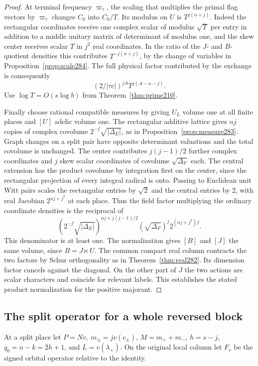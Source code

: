 \documentclass[a4paper,11pt]{article}
\theoremstyle{definition}
\theoremstyle{remark}
\numberwithin{equation}{section}
\begin{document}
\begin{proof}
At terminal frequency \(\varpi_\tau\), the scaling that
multiplies the primal flag vectors by \(\varpi_\tau\)
changes \(C_0\) into \(C_0/T\). Its modulus on \(U\)
is \(T^{j(n+j)}\). Indeed the rectangular coordinates
receive one complex scalar of modulus \(\sqrt T\) per
entry in addition to a middle unitary matrix of determinant
of modulus one, and the skew center receives scalar
\(T\) in \(j^2\) real coordinates. In the ratio of the
\(J\)- and \(B\)-quotient densities this contributes
\(T^{-j(n+j)}\), by the change of variables in
Proposition~\ref{prop:scale284}. The full physical
factor contributed by the exchange is consequently
\[
             (2/|\tau c|)^{jA} T^{j(A-n-j)} .
\]
Use \(\log T=O(s\log b)\) from Theorem~\ref{thm:prime210}.

Finally choose rational compatible measures by giving
\(U_L\) volume one at all finite places and \([U]\)
adelic volume one. The rectangular additive lattice gives
\(nj\) copies of complex covolume
\(2^{-f}\sqrt{|\Delta_E|}\), as in
Proposition~\ref{prop:measure283}. Graph changes on a
split pair have opposite determinant valuations and the
total covolume is unchanged. The center contributes
\(j(j-1)/2\) further complex coordinates and \(j\) skew
scalar coordinates of covolume \(\sqrt{\Delta_F}\) each.
The central extension has the product covolume by
integration first on the center, since the rectangular
projection of every integral radical is onto. Passing
to Euclidean unit Witt pairs scales the rectangular
entries by \(\sqrt2\) and the central entries by \(2\),
with real Jacobian \(2^{nj+j^2}\) at each place. Thus
the field factor multiplying the ordinary coordinate
densities is the reciprocal of
\[
 (2^{-f}\sqrt{|\Delta_E|})^{nj+j(j-1)/2}
       (\sqrt{\Delta_F})^j 2^{(nj+j^2)f}.
\]
This denominator is at least one. The normalization gives
\([B]\) and \([J]\) the same volume, since \(B=J\ltimes U\).
The common compact real column contracts the two factors
by Schur orthogonality as in Theorem~\ref{thm:real282}.
Its dimension factor cancels against the diagonal. On the
other part of \(J\) the two actions are scalar characters
and coincide for relevant labels. This establishes the
stated product normalization for the positive majorant.
\end{proof}

\subsection{The split operator for a whole reversed block}\label{nav:VI-55}
At a split place let \(P=Nv,\ m_\pm=jv(c_\pm)\),
\(M=m_++m_-\), \(h=s-j\), \(q_0=n-k=2h+1\), and
\(L=v(\lambda_+)\). On the original local column let \(F_v\)
be the signed orbital operator relative to the identity.
\end{document}
